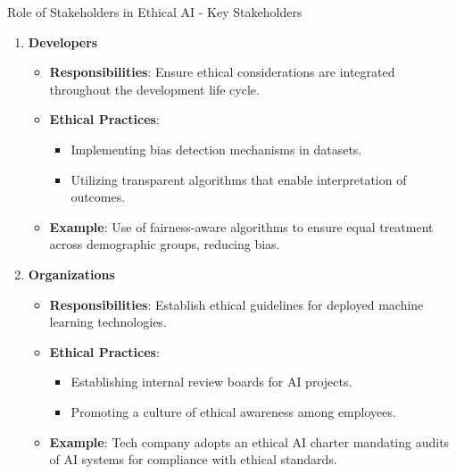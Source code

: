 \documentclass[aspectratio=169]{beamer}
\begin{document}
\begin{frame}[fragile]{Role of Stakeholders in Ethical AI - Key Stakeholders}
    \begin{enumerate}
        \item \textbf{Developers}
            \begin{itemize}
                \item \textbf{Responsibilities}: Ensure ethical considerations are integrated throughout the development life cycle.
                \item \textbf{Ethical Practices}:
                    \begin{itemize}
                        \item Implementing bias detection mechanisms in datasets.
                        \item Utilizing transparent algorithms that enable interpretation of outcomes.
                    \end{itemize}
                \item \textbf{Example}: Use of fairness-aware algorithms to ensure equal treatment across demographic groups, reducing bias.
            \end{itemize}
        
        \item \textbf{Organizations}
            \begin{itemize}
                \item \textbf{Responsibilities}: Establish ethical guidelines for deployed machine learning technologies.
                \item \textbf{Ethical Practices}:
                    \begin{itemize}
                        \item Establishing internal review boards for AI projects.
                        \item Promoting a culture of ethical awareness among employees.
                    \end{itemize}
                \item \textbf{Example}: Tech company adopts an ethical AI charter mandating audits of AI systems for compliance with ethical standards.
            \end{itemize}
        

\end{enumerate}
\end{frame}
\end{document}
